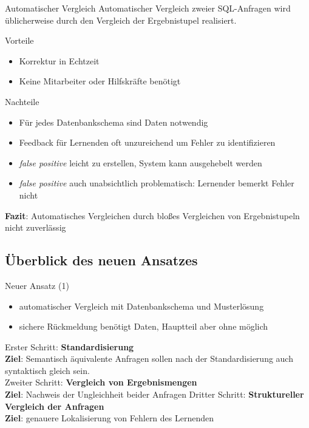 \documentclass{beamer}
\begin{document}
\begin{frame}{Automatischer Vergleich}
Automatischer Vergleich zweier SQL-Anfragen wird üblicherweise durch den Vergleich der Ergebnistupel realisiert.
\begin{block}{Vorteile}
\begin{itemize}
\item Korrektur in Echtzeit
\item Keine Mitarbeiter oder Hilfskräfte benötigt
\end{itemize}
\end{block}

\begin{alertblock}{Nachteile}
\begin{itemize}
\item Für jedes Datenbankschema sind Daten notwendig
\item Feedback für Lernenden oft unzureichend um Fehler zu identifizieren
\item \textit{false positive} leicht zu erstellen, System kann ausgehebelt werden
\item \textit{false positive} auch unabsichtlich problematisch: Lernender bemerkt Fehler nicht
\end{itemize}
\end{alertblock}

\textbf{Fazit}: Automatisches Vergleichen durch bloßes Vergleichen von Ergebnistupeln nicht zuverlässig
\end{frame}

\subsection{Überblick des neuen Ansatzes}

\begin{frame}{Neuer Ansatz (1)}
\begin{itemize}
\item automatischer Vergleich mit Datenbankschema und Musterlösung
\item sichere Rückmeldung benötigt Daten, Hauptteil aber ohne möglich
\end{itemize}

Erster Schritt: \textbf{Standardisierung}\\
\textbf{Ziel}: Semantisch äquivalente Anfragen sollen nach der Standardisierung auch syntaktisch gleich sein.\\
\vspace{4mm}
Zweiter Schritt: \textbf{Vergleich von Ergebnismengen}\\
\textbf{Ziel}: Nachweis der Ungleichheit beider Anfragen
\vspace{4mm}
Dritter Schritt: \textbf{Struktureller Vergleich der Anfragen}\\
\textbf{Ziel}: genauere Lokalisierung von Fehlern des Lernenden
\end{frame}
\end{document}
